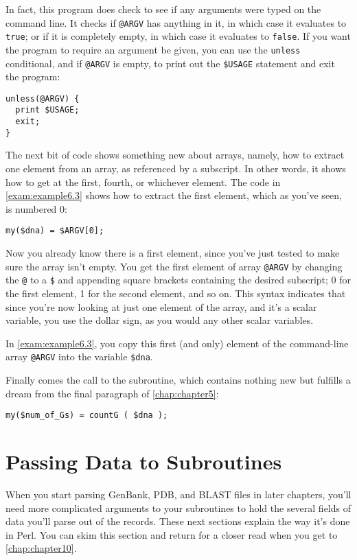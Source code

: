 In fact, this program does check to see if any arguments were typed on the command line. It checks if \verb|@ARGV| has anything in it, in which case it evaluates to \verb|true|; or if it is completely empty, in which case it evaluates to \verb|false|. If you want the program to require an argument be given, you can use the \verb|unless| conditional, and if \verb|@ARGV| is empty, to print out the \verb|$USAGE| statement and exit the program: 

\begin{lstlisting}
unless(@ARGV) {
  print $USAGE;
  exit;
}
\end{lstlisting}

The next bit of code shows something new about arrays, namely, how to extract one element from an array, as referenced by a subscript. In other words, it shows how to get at the first, fourth, or whichever element. The code in \autoref{exam:example6.3} shows how to extract the first element, which as you've seen, is numbered 0:

\begin{lstlisting}
my($dna) = $ARGV[0];
\end{lstlisting}

Now you already know there is a first element, since you've just tested to make sure the array isn't empty. You get the first element of array \verb|@ARGV| by changing the \verb|@| to a \verb|$| and appending square brackets containing the desired subscript; 0 for the first element, 1 for the second element, and so on. This syntax indicates that since you're now looking at just one element of the array, and it's a scalar variable, you use the dollar sign, as you would any other scalar variables.

In \autoref{exam:example6.3}, you copy this first (and only) element of the command-line array \verb|@ARGV| into the variable \verb|$dna|.

Finally comes the call to the subroutine, which contains nothing new but fulfills a dream from the final paragraph of \autoref{chap:chapter5}:

\begin{lstlisting}
my($num_of_Gs) = countG ( $dna );
\end{lstlisting}

\section{Passing Data to Subroutines}
When you start parsing GenBank, PDB, and BLAST files in later chapters, you'll need more complicated arguments to your subroutines to hold the several fields of data you'll parse out of the records. These next sections explain the way it's done in Perl. You can skim this section and return for a closer read when you get to \autoref{chap:chapter10}. 

